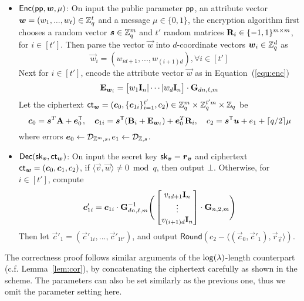 \begin{itemize}[leftmargin=*]
\item $\mathsf{Enc}(\mathsf{pp}, \boldsymbol{w}, \mu)$: On input the public parameter $\mathsf{pp}$, an attribute vector $\boldsymbol{w} = (w_1,..., w_t) \in \mathbb{Z}_q^t$ and a message $\mu \in \{0,1\}$, the encryption algorithm first chooses a random vector $\boldsymbol{s} \in \mathbb{Z}_q^m$ and $t'$ random matrices $\mathbf{R}_i \in \{-1, 1\}^{m \times m}$, for $i \in [t']$. Then parse the vector $\vec{w}$ into $d$-coordinate vectors $\boldsymbol{w}_i \in \mathbb{Z}_q^d$ as
 $$\vec{w}_i = (w_{id + 1},..., w_{(i + 1)d}), \forall i \in [t']$$
Next for $i \in [t']$, encode the attribute vector $\vec{w}$ as in Equation~(\ref{equ:enc})
 $$\mathbf{E}_{\boldsymbol{w}_i} = \big[w_1 \mathbf{I}_n | \cdots | w_d \mathbf{I}_n \big] \cdot
\mathbf{G}_{dn, \ell, m}$$
Let the ciphertext $\mathsf{ct}_{\boldsymbol{w}} = (\boldsymbol{c}_0, \{\boldsymbol{c}_{1i}\}_{i = 1}^{t'}, c_2) \in \mathbb{Z}_q^m \times \mathbb{Z}_q^{t'm} \times \mathbb{Z}_q$ be
$$\boldsymbol{c}_0 = \boldsymbol{s}^T \mathbf{A} + \boldsymbol{e}^{\mathsf{T}}_0, \quad \boldsymbol{c}_{1i} = \boldsymbol{s}^{\mathsf{T}} (\mathbf{B}_i + \mathbf{E}_{\boldsymbol{w}_i}) + \boldsymbol{e}_0^T \mathbf{R}_i, \quad c_2 = \boldsymbol{s}^{\mathsf{T}} \boldsymbol{u} + e_1 + \lceil q / 2 \rceil \mu$$
where errors $\boldsymbol{e}_0 \leftarrow \mathcal{D}_{\mathbb{Z}^m, s}, e_1 \leftarrow \mathcal{D}_{\mathbb{Z}, s}$.

\item $\mathsf{Dec}(\mathsf{sk}_{\boldsymbol{v}}, \mathsf{ct}_{\boldsymbol{w}})$: On input the secret key $\mathsf{sk}_{\boldsymbol{v}} = \boldsymbol{r}_{\boldsymbol{v}}$ and ciphertext $\mathsf{ct}_{\boldsymbol{w}} = (\boldsymbol{c}_0, \boldsymbol{c}_1, c_2)$, if $\langle \vec{v}, \vec{w} \rangle \neq 0 \bmod q$, then output $\bot$. Otherwise, for $i \in [t']$, compute
$$\boldsymbol{c}'_{1i} = \boldsymbol{c}_{1i} \cdot \mathbf{G}_{dn, \ell, m}^{-1}
 \Bigg(\begin{bmatrix}
v_{id + 1}\mathbf{I}_n \\
\vdots \\
v_{(i + 1)d}\mathbf{I}_n
\end{bmatrix} \cdot \mathbf{G}_{n, 2, m}\Bigg)$$
Then let $\vec{c}'_1 = (\vec{c}'_{1i},..., \vec{c}'_{1t'})$, and output $\mathsf{Round}(c_2 - \langle (\vec{c}_0, \vec{c}'_1), \vec{r}_{\vec{v}} \rangle)$.
\end{itemize}
The correctness proof follows similar arguments of the $\log(\lambda)$-length counterpart (c.f. Lemma~\ref{lem:cor}), by  concatenating the ciphertext carefully as shown in the scheme. The parameters can also be set similarly as the previous one, thus we omit the parameter setting here.

